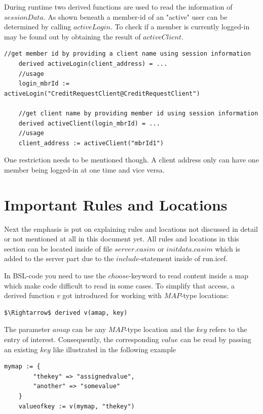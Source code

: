 During runtime two derived functions are used to read the information of $sessionData$. As shown beneath a member-id of an "active" user can be determined by calling $activeLogin$. To check if a member is currently logged-in may be found out by obtaining the result of $activeClient$.

\begin{lstlisting}[language=bsl]
	//get member id by providing a client name using session information
	derived activeLogin(client_address) = ...
	//usage
	login_mbrId := activeLogin("CreditRequestClient@CreditRequestClient")
	
	//get client name by providing member id using session information
	derived activeClient(login_mbrId) = ...
	//usage
	client_address := activeClient("mbrId1")
\end{lstlisting}

One restriction needs to be mentioned though. A client address only can have one member being logged-in at one time and vice versa.

\section{Important Rules and Locations}
\label{sec:impl-rules}

Next the emphasis is put on explaining rules and locations not discussed in detail or not mentioned at all in this document yet. All rules and locations in this section can be located inside of file $server.casim$ or $initdata.casim$ which is added to the server part due to the $include$-statement inside of run.icef.

In BSL-code you need to use the $choose$-keyword to read content inside a map which make code difficult to read in some cases. To simplify that access, a derived function $v$ got introduced for working with $MAP$-type locations:

\begin{lstlisting}[language=bsl,mathescape=true]
	$\Rightarrow$ derived v(amap, key)
\end{lstlisting}

The parameter $amap$ can be any $MAP$-type location and the $key$ refers to the entry of interest. Consequently, the corresponding $value$ can be read by passing an existing $key$ like illustrated in the following example

\begin{lstlisting}[language=bsl,mathescape=true]
	mymap := {
		"thekey" => "assignedvalue",
		"another" => "somevalue"		
	}
	valueofkey := v(mymap, "thekey")
\end{lstlisting}

